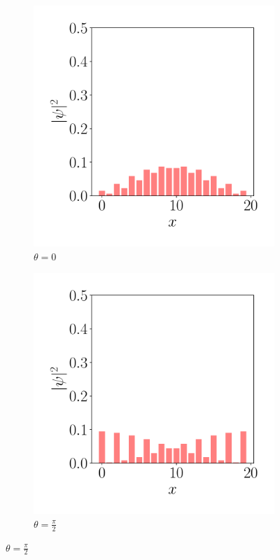 \begin{figure}[h!]
\begin{subfigure}[b!]{0.2 \textwidth}
    \end{subfigure}\hspace*{-0.9em}
    \begin{subfigure}[b!]{0.2 \textwidth}
        \caption*{$\theta=0$}
        \includegraphics[width=\textwidth]{Imagenes/Shh_images/proyection_2.pdf}
    \end{subfigure}\hspace*{-0.9em}
    \begin{subfigure}[b!]{0.2 \textwidth}
        \caption*{$\theta=\frac{\pi}{2}$}
        \includegraphics[width=\textwidth]{Imagenes/Shh_images/proyection_3.pdf}

\end{subfigure}
\end{figure}
